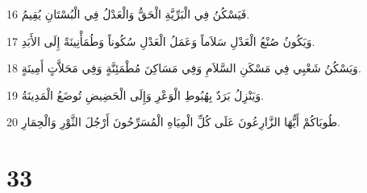 \par 16 فَيَسْكُنُ فِي الْبَرِّيَّةِ الْحَقُّ وَالْعَدْلُ فِي الْبُسْتَانِ يُقِيمُ.
\par 17 وَيَكُونُ صُنْعُ الْعَدْلِ سَلاَماً وَعَمَلُ الْعَدْلِ سُكُوناً وَطُمَأْنِينَةً إِلَى الأَبَدِ.
\par 18 وَيَسْكُنُ شَعْبِي فِي مَسْكَنِ السَّلاَمِ وَفِي مَسَاكِنَ مُطْمَئِنَّةٍ وَفِي مَحَلاَّتٍ أَمِينَةٍ.
\par 19 وَيَنْزِلُ بَرَدٌ بِهُبُوطِ الْوَعْرِ وَإِلَى الْحَضِيضِ تُوضَعُ الْمَدِينَةُ.
\par 20 طُوبَاكُمْ أَيُّهَا الزَّارِعُونَ عَلَى كُلِّ الْمِيَاهِ الْمُسَرِّحُونَ أَرْجُلَ الثَّوْرِ وَالْحِمَارِ.

\chapter{33}

